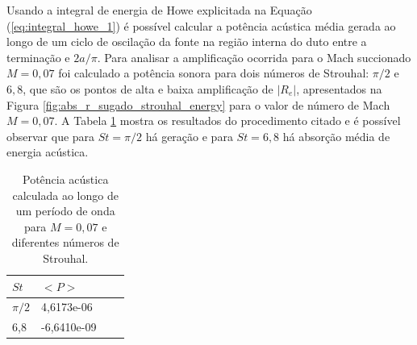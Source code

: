 Usando a integral de energia de Howe explicitada na Equação (\ref{eq:integral_howe_1}) é possível calcular a potência acústica média gerada ao longo de um ciclo de oscilação da fonte na região interna do duto entre a terminação e $2a/\pi$. Para analisar a amplificação ocorrida para o Mach succionado $M = 0,07$ foi calculado a potência sonora para dois números de Strouhal: $\pi/2$ e $6,8$, que são os pontos de alta e baixa amplificação de $|R_{e}|$, apresentados na Figura \ref{fig:abs_r_sugado_strouhal_energy} para o valor de número de Mach $M = 0,07$. A Tabela \ref{table:potencia} mostra os resultados do procedimento citado e é possível observar que para $St = \pi/2$ há geração e para $St = 6,8$ há absorção média de energia acústica. 

\begin{table}[ht!]
\centering
\caption{Potência acústica calculada ao longo de um período de onda para $M = 0,07$ e diferentes números de Strouhal.}
\label{table:potencia}
    \begin{tabular}{|l|l|l|l|}
        \hline
        $St$ & $<P>$ \\ \hline
        $\pi/2$ & 4,6173e-06  \\ \hline  
        6,8 & -6,6410e-09 \\ \hline
    \end{tabular}
\end{table}

